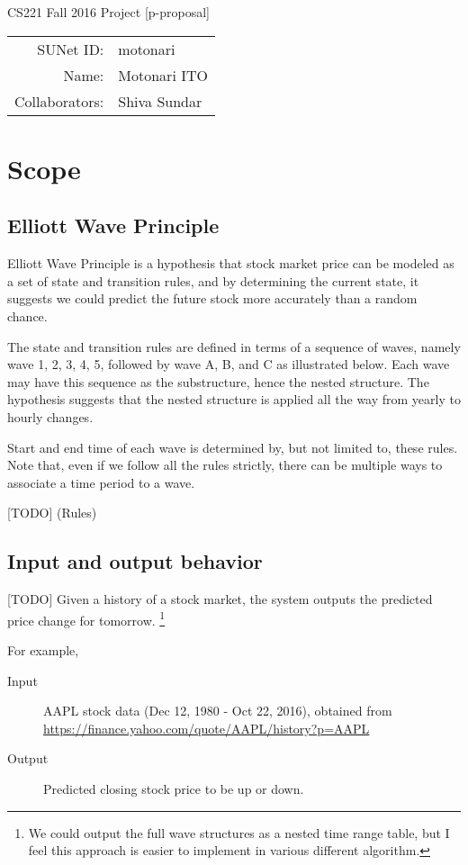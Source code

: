 \documentclass[12pt]{article}
\begin{document}
\begin{center}
{\Large CS221 Fall 2016 Project [p-proposal]}

\begin{tabular}{rl}
SUNet ID: & motonari \\
Name: & Motonari ITO \\
Collaborators: & Shiva Sundar
\end{tabular}
\end{center}

\section*{Scope}

\subsection*{Elliott Wave Principle}

Elliott Wave Principle is a hypothesis that stock market price can be
modeled as a set of state and transition rules, and by determining the
current state, it suggests we could predict the future stock more
accurately than a random chance.

The state and transition rules are defined in terms of a sequence of
waves, namely wave 1, 2, 3, 4, 5, followed by wave A, B, and C as
illustrated below. Each wave may have this sequence as the
substructure, hence the nested structure. The hypothesis suggests that
the nested structure is applied all the way from yearly to hourly
changes.

Start and end time of each wave is determined by, but not limited to,
these rules. Note that, even if we follow all the rules strictly,
there can be multiple ways to associate a time period to a wave. 

[TODO] (Rules)


\subsection*{Input and output behavior}

[TODO] Given a history of a stock market, the system outputs the
predicted price change for tomorrow. \footnote{We could output the
  full wave structures as a nested time range table, but I feel this
  approach is easier to implement in various different algorithm.}

For example,

\begin{description}
\item[Input] AAPL stock data (Dec 12, 1980 - Oct 22, 2016), obtained from \url{https://finance.yahoo.com/quote/AAPL/history?p=AAPL}
\item[Output] Predicted closing stock price to be up or down.
\end{description}
\end{document}
